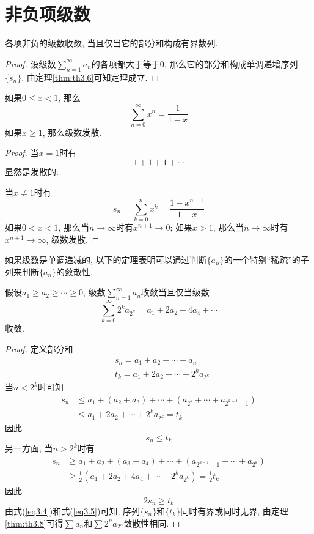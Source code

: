 \documentclass[cn,12pt,math=mtpro2,citestyle=gb7714-2015,bibstyle=gb7714-2015,twocol]{elegantbook}
\begin{document}
\section{非负项级数}
\begin{theorem}\label{thm:th3.8}
  各项非负的级数收敛, 当且仅当它的部分和构成有界数列.
\end{theorem}
\begin{proof}
  设级数$\sum_{n=1}^{\infty}a_n$的各项都大于等于0, 那么它的部分和构成单调递增序列$\{s_n\}$. 由定理\ref{thm:th3.6}可知定理成立.
\end{proof}
\begin{theorem}\label{thm:th3.15}
  如果$0\leq x<1$, 那么
  $$\sum_{n=0}^{\infty}x^n=\frac{1}{1-x}$$
  如果$x\geq 1$, 那么级数发散.
\end{theorem}
\begin{proof}
  当$x=1$时有
  $$1+1+1+\cdots$$
  显然是发散的.

  当$x\neq 1$时有
  $$s_n=\sum_{k=0}^{n}x^k=\frac{1-x^{n+1}}{1-x}$$
  如果$0<x<1$, 那么当$n\rightarrow\infty$时有$x^{n+1}\rightarrow0$; 如果$x>1$, 那么当$n\rightarrow\infty$时有$x^{n+1}\rightarrow\infty$, 级数发散.

\end{proof}
如果级数是单调递减的, 以下的定理表明可以通过判断$\{a_n\}$的一个特别“稀疏”的子列来判断$\{a_n\}$的敛散性.
\begin{theorem}\label{thm:th3.9}
  假设$a_1\geq a_2\geq\cdots\geq 0$, 级数$\sum_{n=1}^{\infty}a_n$收敛当且仅当级数
  $$\sum_{k=0}^{\infty}2^ka_{2^k}=a_1+2a_2+4a_4+\cdots$$
  收敛.
\end{theorem}
\begin{proof}
  定义部分和
  \begin{align*}
  &s_n=a_1+a_2+\cdots+a_n\\
  &t_k=a_1+2a_2+\cdots+2^ka_{2^k}
  \end{align*}
  当$n<2^k$时可知
  \begin{align*}
  s_n&\leq a_1+(a_2+a_3)+\cdots+(a_{2^k}+\cdots+a_{2^{k+1}-1})\\
  &\leq a_1+2a_2+\cdots+2^ka_{2^k}=t_k
  \end{align*}
  因此
  \begin{equation}\label{eq3.4}
    s_n\leq t_k
  \end{equation}
  另一方面, 当$n>2^k$时有
  \begin{align*}
  s_n&\geq a_1+a_2+(a_3+a_4)+\cdots+(a_{2^{k-1}-1}+\cdots+a_{2^k})\\
  &\geq\frac{1}{2}\left(a_1+2a_2+4a_4+\cdots+2^{k}a_{2^k}\right)=\frac{1}{2}t_k
  \end{align*}
  因此
  \begin{equation}\label{eq3.5}
    2s_n\geq t_k
  \end{equation}
  由式(\ref{eq3.4})和式(\ref{eq3.5})可知, 序列$\{s_n\}$和$\{t_k\}$同时有界或同时无界, 由定理\ref{thm:th3.8}可得$\sum a_n$和$\sum 2^na_{2^n}$敛散性相同.


\end{proof}
\end{document}
